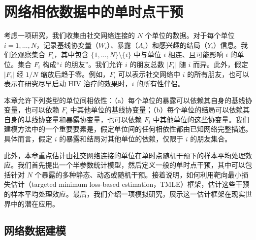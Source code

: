 \begingroup
\raggedbottom
\lstset{numbers=none,frame=none}
\chapter{网络相依数据中的单时点干预}

考虑一项研究，我们收集由社交网络连接的 $N$ 个单位的数据。对于每个单位 $i=1,\ldots,N$，记录基线协变量（$W_i$）、暴露（$A_i$）和感兴趣的结局（$Y_i$）信息。我们还观察集合 $F_i$，其中包含 $\{1,\ldots,N\}\setminus\{i\}$ 中与单位 $i$ 相连、且可能影响 $i$ 的单位。集合 $F_i$ 构成“$i$ 的朋友”。我们允许 $i$ 的朋友总数 $|F_i|$ 随 $i$ 而异。此外，假定 $|F_i|$ 经 $1/N$ 缩放后趋于零。例如，$F_i$ 可以表示社交网络中 $i$ 的所有朋友，也可以表示在研究尽早启动 HIV 治疗的效果时，$i$ 的所有性伴侣。

本章允许下列类型的单位间相依性：（a）每个单位的暴露可以依赖其自身的基线协变量，也可以依赖 $F_i$ 中其他单位的基线协变量；（b）每个单位的结局可以依赖其自身的基线协变量和暴露协变量，也可以依赖 $F_i$ 中其他单位的这些协变量。我们建模方法中的一个重要要素是，假定单位间的任何相依性都由已知网络完整描述。具体而言，假定 $i$ 的暴露和结局对其他单位的依赖，仅限于 $i$ 的朋友集合。

\begin{sourcebox}
此外，本章重点估计由社交网络连接的单位在单时点随机干预下的样本平均处理效应。我们首先提出一个半参数统计模型，然后定义一般的单时点干预，其中可以包括针对 $N$ 个暴露的多种静态、动态或随机干预。接着说明，如何利用靶向最小损失估计（targeted minimum loss-based estimation，TMLE）框架，估计这些干预的样本平均处理效应。最后，我们介绍一项模拟研究，展示这一估计框架在现实世界中的潜在应用。
\end{sourcebox}

\section{网络数据建模}

